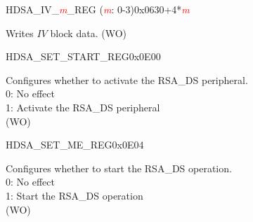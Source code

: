 


\begin{register}{H}{DSA\_IV\_\textcolor{red}{\it{m}}\_REG (\textcolor{red}{\it{m}}: 0-3)}{0x0630+4*\textcolor{red}{\it{m}}}\label{regdesc:DSAIVREG}
%
\regnewline%
\begin{regdesc}\begin{reglist}
\item [DSA\_IV\_\textcolor{red}{\it{m}}\_REG (\textcolor{red}{\it{m}}: 0-3)] Writes \begin{math}IV\end{math} block data. (WO)
\end{reglist}\end{regdesc}
\end{register}


\begin{register}{H}{DSA\_SET\_START\_REG}{0x0E00}\label{regdesc:DSASETSTARTREG}
%
%
\regnewline%
\begin{regdesc}\begin{reglist}
\item [DSA\_SET\_START] Configures whether to activate the RSA\_DS peripheral.\\
0: No effect\\
1: Activate the RSA\_DS peripheral\\
(WO)
\end{reglist}\end{regdesc}
\end{register}


\begin{register}{H}{DSA\_SET\_ME\_REG}{0x0E04}\label{regdesc:DSASETMEREG}
%
%
\regnewline%
\begin{regdesc}\begin{reglist}
\item [DSA\_SET\_ME] Configures whether to start the RSA\_DS operation. \\
0: No effect\\
1: Start the RSA\_DS operation\\
(WO)
\end{reglist}\end{regdesc}
\end{register}


